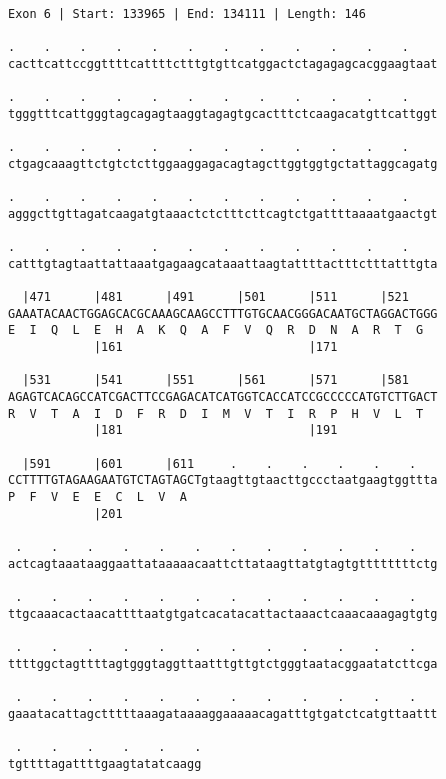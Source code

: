 \documentclass{article}
\begin{document}
\begin{Verbatim}[fontfamily=courier]
Exon 6 | Start: 133965 | End: 134111 | Length: 146

.    .    .    .    .    .    .    .    .    .    .    .    
cacttcattccggttttcattttctttgtgttcatggactctagagagcacggaagtaat

.    .    .    .    .    .    .    .    .    .    .    .    
tgggtttcattgggtagcagagtaaggtagagtgcactttctcaagacatgttcattggt

.    .    .    .    .    .    .    .    .    .    .    .    
ctgagcaaagttctgtctcttggaaggagacagtagcttggtggtgctattaggcagatg

.    .    .    .    .    .    .    .    .    .    .    .    
agggcttgttagatcaagatgtaaactctctttcttcagtctgattttaaaatgaactgt

.    .    .    .    .    .    .    .    .    .    .    .    
catttgtagtaattattaaatgagaagcataaattaagtattttactttctttatttgta

  |471      |481      |491      |501      |511      |521    
GAAATACAACTGGAGCACGCAAAGCAAGCCTTTGTGCAACGGGACAATGCTAGGACTGGG
E  I  Q  L  E  H  A  K  Q  A  F  V  Q  R  D  N  A  R  T  G  
            |161                          |171              

  |531      |541      |551      |561      |571      |581    
AGAGTCACAGCCATCGACTTCCGAGACATCATGGTCACCATCCGCCCCCATGTCTTGACT
R  V  T  A  I  D  F  R  D  I  M  V  T  I  R  P  H  V  L  T  
            |181                          |191              

  |591      |601      |611     .    .    .    .    .    .   
CCTTTTGTAGAAGAATGTCTAGTAGCTgtaagttgtaacttgccctaatgaagtggttta
P  F  V  E  E  C  L  V  A                                   
            |201                                            

 .    .    .    .    .    .    .    .    .    .    .    .   
actcagtaaataaggaattataaaaacaattcttataagttatgtagtgttttttttctg

 .    .    .    .    .    .    .    .    .    .    .    .   
ttgcaaacactaacattttaatgtgatcacatacattactaaactcaaacaaagagtgtg

 .    .    .    .    .    .    .    .    .    .    .    .   
ttttggctagttttagtgggtaggttaatttgttgtctgggtaatacggaatatcttcga

 .    .    .    .    .    .    .    .    .    .    .    .   
gaaatacattagctttttaaagataaaaggaaaaacagatttgtgatctcatgttaattt

 .    .    .    .    .    .
tgttttagattttgaagtatatcaagg
\end{Verbatim}
\end{document}
